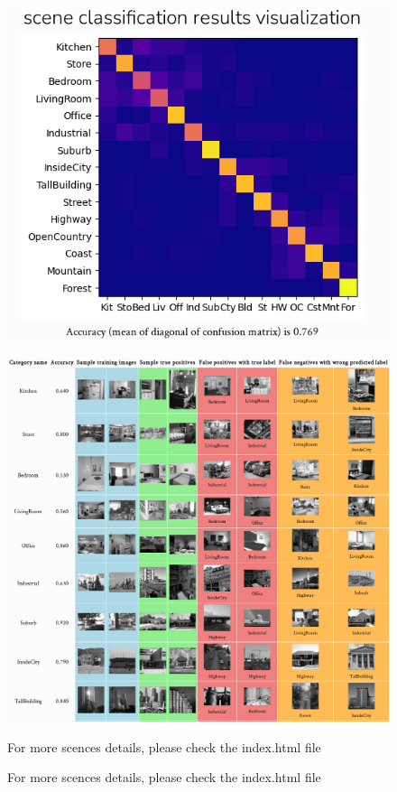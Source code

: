 \begin{figure}[htbp]
    \centering
    \includegraphics[scale=0.7]{confusion.png}
\end{figure}

\begin{figure}[htbp]
    \centering
    \includegraphics[scale=0.6]{scence_table.png}
    \caption{For more scences details, please check the index.html file}
    \caption{For more scences details, please check the index.html file}
\end{figure}

